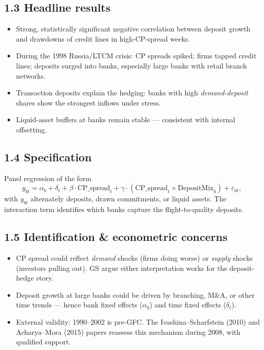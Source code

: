 \documentclass[11pt]{article}
\begin{document}
\subsection*{1.3 Headline results}
\begin{itemize}
\item Strong, statistically significant negative correlation between deposit growth and drawdowns of credit lines in high-CP-spread weeks.
\item During the 1998 Russia/LTCM crisis: CP spreads spiked; firms tapped credit lines; deposits surged into banks, especially large banks with retail branch networks.
\item Transaction deposits explain the hedging: banks with high \emph{demand-deposit} shares show the strongest inflows under stress.
\item Liquid-asset buffers at banks remain stable --- consistent with internal offsetting.
\end{itemize}

\subsection*{1.4 Specification}
Panel regression of the form
\[
y_{bt} = \alpha_b + \delta_t + \beta\cdot \text{CP\_spread}_t + \gamma\cdot (\text{CP\_spread}_t\times \text{DepositMix}_b) + \varepsilon_{bt},
\]
with $y_{bt}$ alternately deposits, drawn commitments, or liquid assets. The interaction term identifies which banks capture the flight-to-quality deposits.

\subsection*{1.5 Identification \& econometric concerns}
\begin{alertbox}
\begin{itemize}
\item CP spread could reflect \emph{demand} shocks (firms doing worse) or \emph{supply} shocks (investors pulling out). GS argue either interpretation works for the deposit-hedge story.
\item Deposit growth at large banks could be driven by branching, M\&A, or other time trends --- hence bank fixed effects ($\alpha_b$) and time fixed effects ($\delta_t$).
\item External validity: 1990--2002 is pre-GFC. The Ivashina--Scharfstein (2010) and Acharya--Mora (2015) papers reassess this mechanism during 2008, with qualified support.
\end{itemize}
\end{alertbox}
\end{document}
